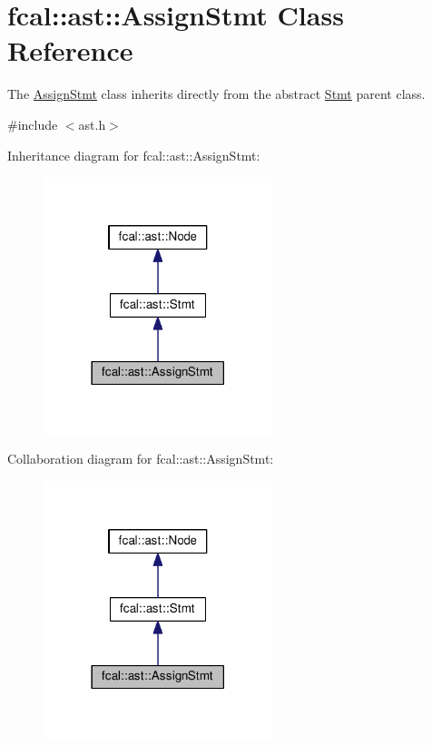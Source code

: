\hypertarget{classfcal_1_1ast_1_1AssignStmt}{}\section{fcal\+:\+:ast\+:\+:Assign\+Stmt Class Reference}
\label{classfcal_1_1ast_1_1AssignStmt}


The \hyperlink{classfcal_1_1ast_1_1AssignStmt}{Assign\+Stmt} class inherits directly from the abstract \hyperlink{classfcal_1_1ast_1_1Stmt}{Stmt} parent class.  




{\ttfamily \#include $<$ast.\+h$>$}



Inheritance diagram for fcal\+:\+:ast\+:\+:Assign\+Stmt\+:\nopagebreak
\begin{figure}[H]
\begin{center}
\leavevmode
\includegraphics[width=189pt]{classfcal_1_1ast_1_1AssignStmt__inherit__graph}
\end{center}
\end{figure}


Collaboration diagram for fcal\+:\+:ast\+:\+:Assign\+Stmt\+:\nopagebreak
\begin{figure}[H]
\begin{center}
\leavevmode
\includegraphics[width=189pt]{classfcal_1_1ast_1_1AssignStmt__coll__graph}
\end{center}
\end{figure}
